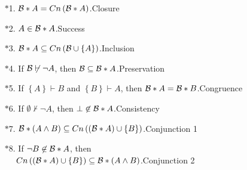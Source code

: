 \begin{enumerate}
\item[$*$1.] $\begin{cal}B\end{cal}*A=Cn\left(\begin{cal}B\end{cal}*A\right)$.\hfill Closure
\item[$*$2.] $A\in\begin{cal}B\end{cal}*A$.\hfill Success
\item[$*$3.] $\begin{cal}B\end{cal}*A\subseteq Cn\left(\begin{cal}B\end{cal}\cup\left\{A\right\}\right)$.\hfill Inclusion
\item[$*$4.] If $\begin{cal}B\end{cal}\not\vdash\neg A$, then $\begin{cal}B\end{cal}\subseteq\begin{cal}B\end{cal}*A$.\hfill Preservation
\item[$*$5.] If $\left\{A\right\}\vdash B$ and $\left\{B\right\}\vdash A$, then $\begin{cal}B\end{cal}*A=\begin{cal}B\end{cal}*B$.\hfill Congruence
\item[$*$6.] If $\emptyset\not\vdash\neg A$, then $\bot\not\in\begin{cal}B\end{cal}*A$.\hfill Consistency
\item[$*$7.] $\begin{cal}B\end{cal}*\left(A\wedge  B\right)\subseteq Cn\left(\left(\begin{cal}B\end{cal}*A\right)\cup\left\{B\right\}\right)$.\hfill Conjunction 1
\item[$*$8.] If $\neg B\not\in\begin{cal}B\end{cal}*A$, then\\$\phantom{M}$\hspace{1em}  $Cn\left(\left(\begin{cal}B\end{cal}*A\right)\cup\left\{B\right\}\right)\subseteq\begin{cal}B\end{cal}*\left(A\wedge B\right)$.\hfill Conjunction 2
\end{enumerate}

